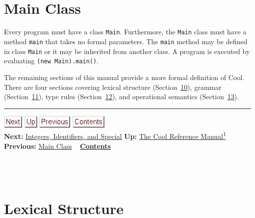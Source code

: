 \documentclass[]{article}
\begin{document}
\section{\\ Main Class}

Every program must have a class \texttt{Main}. Furthermore, the
\texttt{Main} class must have a method \texttt{main} that takes no
formal parameters. The \texttt{main} method may be defined in class
\texttt{Main} or it may be inherited from another class. A program is
executed by evaluating \texttt{(new Main).main()}.

The remaining sections of this manual provide a more formal definition
of Cool. There are four sections covering lexical structure
(Section~\href{node33.html\#lex-struct}{10}), grammar
(Section~\href{node39.html\#sec-gram}{11}), type rules
(Section~\href{node41.html\#sec-typrules}{12}), and operational
semantics (Section~\href{node44.html\#sec-opsem}{13}).

\begin{center}\rule{3in}{0.4pt}\end{center}

\href{node34.html}{\includegraphics{next.png}}
\href{cool-manual.html}{\includegraphics{up.png}}
\href{node32.html}{\includegraphics{prev.png}}
\href{node1.html}{\includegraphics{contents.png}} \\ \textbf{Next:}
\href{node34.html}{Integers, Identifiers, and Special} \textbf{Up:}
\href{cool-manual.html}{The Cool Reference Manual\textsuperscript{1}}
\textbf{Previous:} \href{node32.html}{Main Class} ~
\textbf{\href{node1.html}{Contents}} \\ \\

\section{\\ Lexical Structure}
\end{document}
